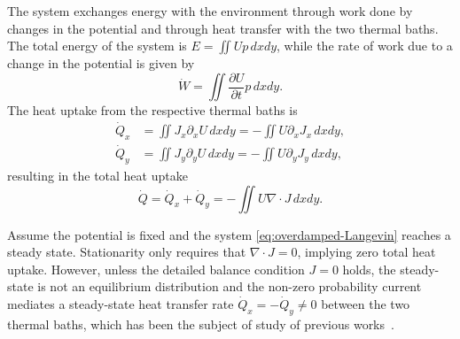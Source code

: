 \documentclass[
 reprint,
superscriptaddress,
 amsmath,amssymb,prl
 aps
]{revtex4-2}
\newcommand{\nablax}{{\partial_x}}
\newcommand{\nablay}{{\partial_y}}
\begin{document}
The system exchanges energy with the environment through work done by changes in the potential and through heat transfer with the two thermal baths. The total energy of the system is $E = \iint U p \, dx dy$, while the rate of work due to a change in the potential is given by
\begin{equation}\label{eq:work-p}
    \dot{W} = \iint \frac{\partial U}{\partial t} p\, dx dy.
\end{equation}
The heat uptake from the respective thermal baths is
\begin{align*}
    \dot{Q}_x &= \iint  J_x \nablax U \, dx dy
    = - \iint  U \nablax J_x \,dx dy ,\\
     \dot{Q}_y &= \iint    J_y\nablay U\,dx dy  = - \iint U \nablay J_y \,dx dy,
\end{align*}
resulting in the total heat uptake
\begin{equation}\label{eq:heat-p}
    \dot{Q} = \dot{Q}_x + \dot{Q}_y=- \iint  U \nabla \cdot J\,dx dy.
\end{equation}

Assume the potential is fixed and the system \eqref{eq:overdamped-Langevin} reaches a steady state. Stationarity only requires that $\nabla \cdot J=0$, implying zero total heat uptake. However, unless the detailed balance condition $J = 0$ holds, the steady-state is not an equilibrium distribution and the non-zero probability current mediates a steady-state heat transfer rate $\dot Q_x=-\dot Q_y\neq 0$ between the two thermal baths, which has been the subject of study of previous works~\cite{BGyrator2017electrical,Bgyrator2013ciliberto}.
\end{document}
